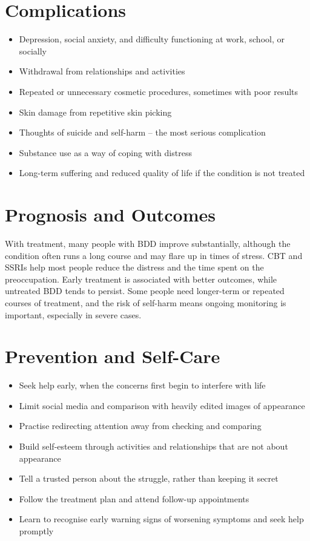 \section*{Complications}
\begin{itemize}
    \item Depression, social anxiety, and difficulty functioning at work, school, or socially
    \item Withdrawal from relationships and activities
    \item Repeated or unnecessary cosmetic procedures, sometimes with poor results
    \item Skin damage from repetitive skin picking
    \item Thoughts of suicide and self-harm -- the most serious complication
    \item Substance use as a way of coping with distress
    \item Long-term suffering and reduced quality of life if the condition is not treated
\end{itemize}

\section*{Prognosis and Outcomes}
With treatment, many people with BDD improve substantially, although the condition often runs a long course and may flare up in times of stress. CBT and SSRIs help most people reduce the distress and the time spent on the preoccupation. Early treatment is associated with better outcomes, while untreated BDD tends to persist. Some people need longer-term or repeated courses of treatment, and the risk of self-harm means ongoing monitoring is important, especially in severe cases.

\section*{Prevention and Self-Care}
\begin{itemize}
    \item Seek help early, when the concerns first begin to interfere with life
    \item Limit social media and comparison with heavily edited images of appearance
    \item Practise redirecting attention away from checking and comparing
    \item Build self-esteem through activities and relationships that are not about appearance
    \item Tell a trusted person about the struggle, rather than keeping it secret
    \item Follow the treatment plan and attend follow-up appointments
    \item Learn to recognise early warning signs of worsening symptoms and seek help promptly
\end{itemize}

